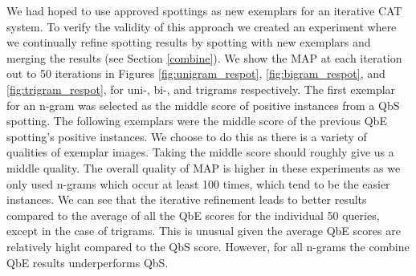 \documentclass[ms,electronic,twosidetoc,letterpaper,chaptercenter,parttop,lol,lof,lot]{byumsphd}
\begin{document}
We had hoped to use approved spottings as new exemplars for an iterative CAT system. To verify the validity of this approach we created an experiment where we continually refine spotting results by spotting with new exemplars and merging the results (see Section \ref{combine}). We show the MAP at each iteration out to 50 iterations in Figures \ref{fig:unigram_respot}, \ref{fig:bigram_respot}, and \ref{fig:trigram_respot}, for uni-, bi-, and trigrams respectively. The first exemplar for an n-gram was selected as the middle score of positive instances from a QbS spotting. The following exemplars were the middle score of the previous QbE spotting's positive instances. We choose to do this as there is a variety of qualities of exemplar images. Taking the middle score should roughly give us a middle quality.
The overall quality of MAP is higher in these experiments as we only used n-grams which occur at least 100 times, which tend to be the easier instances.
We can see that the iterative refinement leads to better results compared to the average of all the QbE scores for the individual 50 queries, except in the case of trigrams. This is unusual given the average QbE scores are relatively hight compared to the QbS score. However, for all n-grams the combine QbE results underperforms QbS.
\end{document}
